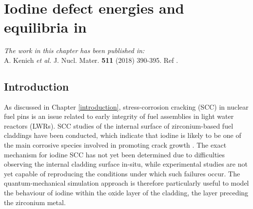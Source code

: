 \chapter{Iodine defect energies and equilibria in \zirconia}

\emph{The work in this chapter has been published in:} \\ A. Kenich \emph{et al.} J. Nucl. Mater. \textbf{511} (2018) 390-395. Ref \cite{kenichiodine2018}.

\label{ch:results2}

\section{Introduction}

As discussed in Chapter \ref{introduction}, stress-corrosion cracking (SCC) in nuclear fuel pins is an issue related to early integrity of fuel assemblies in light water reactors (LWRs). SCC studies of the internal surface of zirconium-based fuel claddings have been conducted, which indicate that iodine is likely to be one of the main corrosive species involved in promoting crack growth \cite{rosenbaum1966interaction, bcoxpelletclad1990,fregonese2000failure,Sidky1998}. The exact mechanism for iodine SCC has not yet been determined due to difficulties observing the internal cladding surface in-situ, while experimental studies are not yet capable of reproducing the conditions under which such failures occur. The quantum-mechanical simulation approach is therefore particularly useful to model the behaviour of iodine within the oxide layer of the cladding, the layer preceding the zirconium metal. 

